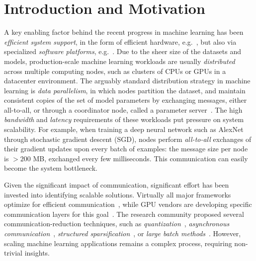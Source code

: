 \documentclass[11pt]{article}
\begin{document}
\maketitle

\section{Introduction and Motivation}

A key enabling factor behind the recent progress in machine learning has been \emph{efficient system support}, in the form of efficient hardware, e.g.~\cite{TPU}, but also via specialized \emph{software platforms}, e.g.~\cite{TF, CNTK, MXNET}. 
Due to the sheer size of the datasets and models, production-scale machine learning workloads are usually \emph{distributed} across multiple computing nodes, such as  clusters of CPUs or GPUs in a datacenter environment. 
The arguably standard distribution strategy in machine learning is \emph{data parallelism}, in which nodes partition the dataset, and maintain consistent copies of the set of model parameters by exchanging messages, either all-to-all, or through a coordinator node, called a parameter server~\cite{PS}.  
The high \emph{bandwidth} and \emph{latency} requirements of these workloads put pressure on system scalability. 
For example, when training a deep neural network such as AlexNet~\cite{AlexNet} through stochastic gradient descent (SGD), nodes perform \emph{all-to-all} exchanges of their gradient updates upon every batch of examples: the message size per node is $>200$ MB, exchanged every few milliseconds. This communication can easily become the system bottleneck. 

Given the significant impact of communication, significant effort has been invested into identifying scalable solutions. Virtually all major frameworks  optimize for efficient communication~\cite{CNTK, seide20141, TF, MXNET, PyTorch}, while GPU vendors are developing specific communication layers for this goal~\cite{NCCL}. 
The research community proposed several communication-reduction techniques, such as \emph{quantization}~\cite{seide20141, alistarh2016qsgd}, \emph{asynchronous communication}~\cite{zhang2017yellowfin},  \emph{structured sparsification}~\cite{aji2017sparse, dryden2016communication, sun2017meprop}, or \emph{large batch methods}~\cite{goyal2017accurate, you2017scaling}. However, scaling machine learning applications remains a complex process, requiring non-trivial insights. 
\end{document}
